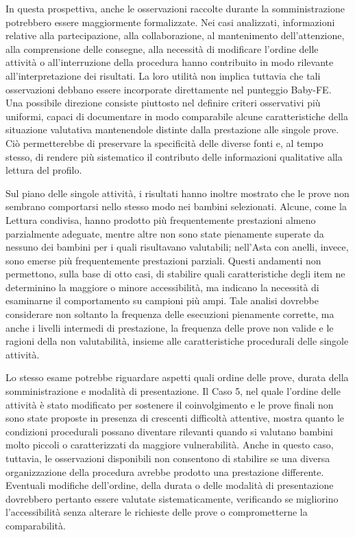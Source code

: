 In questa prospettiva, anche le osservazioni raccolte durante la somministrazione potrebbero essere maggiormente formalizzate. Nei casi analizzati, informazioni relative alla partecipazione, alla collaborazione, al mantenimento dell'attenzione, alla comprensione delle consegne, alla necessità di modificare l'ordine delle attività o all'interruzione della procedura hanno contribuito in modo rilevante all'interpretazione dei risultati. La loro utilità non implica tuttavia che tali osservazioni debbano essere incorporate direttamente nel punteggio Baby-FE. Una possibile direzione consiste piuttosto nel definire criteri osservativi più uniformi, capaci di documentare in modo comparabile alcune caratteristiche della situazione valutativa mantenendole distinte dalla prestazione alle singole prove. Ciò permetterebbe di preservare la specificità delle diverse fonti e, al tempo stesso, di rendere più sistematico il contributo delle informazioni qualitative alla lettura del profilo.

Sul piano delle singole attività, i risultati hanno inoltre mostrato che le prove non sembrano comportarsi nello stesso modo nei bambini selezionati. Alcune, come la Lettura condivisa, hanno prodotto più frequentemente prestazioni almeno parzialmente adeguate, mentre altre non sono state pienamente superate da nessuno dei bambini per i quali risultavano valutabili; nell'Asta con anelli, invece, sono emerse più frequentemente prestazioni parziali. Questi andamenti non permettono, sulla base di otto casi, di stabilire quali caratteristiche degli item ne determinino la maggiore o minore accessibilità, ma indicano la necessità di esaminarne il comportamento su campioni più ampi. Tale analisi dovrebbe considerare non soltanto la frequenza delle esecuzioni pienamente corrette, ma anche i livelli intermedi di prestazione, la frequenza delle prove non valide e le ragioni della non valutabilità, insieme alle caratteristiche procedurali delle singole attività.

Lo stesso esame potrebbe riguardare aspetti quali ordine delle prove, durata della somministrazione e modalità di presentazione. Il Caso 5, nel quale l'ordine delle attività è stato modificato per sostenere il coinvolgimento e le prove finali non sono state proposte in presenza di crescenti difficoltà attentive, mostra quanto le condizioni procedurali possano diventare rilevanti quando si valutano bambini molto piccoli o caratterizzati da maggiore vulnerabilità. Anche in questo caso, tuttavia, le osservazioni disponibili non consentono di stabilire se una diversa organizzazione della procedura avrebbe prodotto una prestazione differente. Eventuali modifiche dell'ordine, della durata o delle modalità di presentazione dovrebbero pertanto essere valutate sistematicamente, verificando se migliorino l'accessibilità senza alterare le richieste delle prove o comprometterne la comparabilità.

